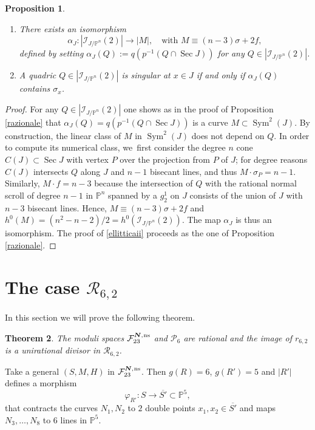 \documentclass[JEP,XML,SOM,Unicode,NoEqCountersInSection,published]{cedram}
\newcommand{\ns}{{\mkern1mu\mathrm{ns}}}
\newcommand{\bN}{\boldsymbol{N}}
\theoremstyle{plain}
\newtheorem{thm}{Theorem}[section]
\newtheorem{prop}[thm]{Proposition}
\theoremstyle{definition}
\DeclareMathOperator{\Sec}{Sec}
\DeclareMathOperator{\Sym}{Sym}
\newcommand\PP{{\mathbb P}}
\newcommand\F{{\mathcal F}}
\newcommand\I{{\mathcal I}}
\renewcommand\P{{\mathcal P}}
\newcommand\R{{\mathcal R}}
\begin{document}
\skpt
\begin{prop}\label{ellittica}
\begin{enumerate}
\item\label{ellitticai}
There exists an isomorphism
\[
\alpha_J: |\I_{J/\PP^n}(2)|\to |M|, \quad\text{with }M\equiv (n-3)\sigma+2f,
\]
defined by setting $\alpha_J(Q):=q(p^{-1}(Q\cap\Sec J))$ for any $Q\in |\I_{J/\PP^n}(2)|$.
\item\label{ellitticaii}
A quadric $Q\in |\I_{J/\PP^n}(2)|$ is singular at $x\in J$ if and only if $\alpha_J(Q)$ contains $\sigma _x$.
\end{enumerate}
\end{prop}

\begin{proof}
For any $Q\in |\I_{J/\PP^n}(2)|$ one shows as in the proof of Proposition \ref{razionale} that $\alpha_J(Q)=q(p^{-1}(Q\cap\Sec J))$ is a curve $M\subset\Sym^2(J)$. By construction, the linear class of $M$ in $\Sym^2(J)$ does not depend on $Q$. In order to compute its numerical class, we~first consider the degree $n$ cone $C(J)\subset \Sec J$ with vertex $P$ over the projection from $P$ of $J$; for degree reasons $C(J)$ intersects $Q$ along $J$ and $n-1$ bisecant lines, and thus $M\cdot \sigma_P=n-1$. Similarly,  $M\cdot f=n-3$ because the intersection of $Q$ with the rational normal scroll of degree $n-1$ in $\PP^n$ spanned by a $g^1_2$ on $J$ consists of the union of $J$ with $n-3$ bisecant lines. Hence, $M\equiv (n-3)\sigma+2f$ and $h^0(M)=(n^2-n-2)/2=h^0(\I_{J/\PP^n}(2))$. The map $\alpha_J$ is thus an isomorphism. The proof of \eqref{ellitticaii} proceeds as the one of Proposition \ref{razionale}.
\end{proof}

\section{The case \texorpdfstring{$\R_{6,2}$}{R}}

In this section we will prove the following theorem.

\begin{thm}\label{seidue}
The moduli spaces $\F_{23}^{\bN,\ns}$ and $\P_{6}$ are rational and the image of $r_{6,2}$ is a unirational divisor in $\R_{6,2}$.
\end{thm}

Take a general $(S,M,H)$ in $\F_{23}^{\bN,\ns}$. Then $g(R)=6$, $g(R')=5$ and $|R'|$ defines a morphism
\[
\varphi_{R'}:S\to \overline{S'}\subset \PP^5,
\]
that contracts the curves $N_1,N_2$ to $2$ double points $x_1,x_2\in \overline{S'}$ and maps $N_3,\ldots,N_8$ to $6$ lines in $\PP^5$.
\end{document}
